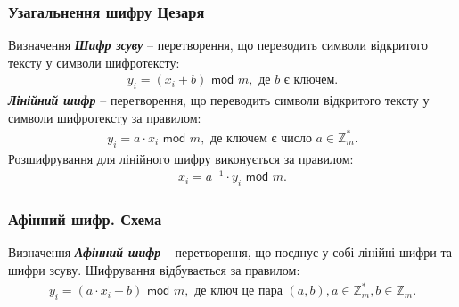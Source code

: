 \documentclass{../zkdl-presentation-template}
\begin{document}
\begin{frame}
    \frametitle{Узагальнення шифру Цезаря}
    \begin{exampleblock}{Визначення}
        \textbf{\textit{Шифр зсуву}} -- перетворення, що переводить символи відкритого тексту у символи шифротексту:
        \vspace{-5mm}
        \begin{align*}
            y_i=(x_i+b)\textsf{ mod }m, \text{ де $b$ є ключем.}
        \end{align*} 
        \textbf{\textit{Лінійний шифр}} -- перетворення, що переводить символи відкритого тексту у символи шифротексту за правилом:
        \vspace{-2mm}
        \begin{align*}
            y_i=a\cdot x_i\textsf{ mod }m, \text{ де ключем є число $a\in\mathbb{Z}_m^*$}.
        \end{align*}
        Розшифрування для лінійного шифру виконується за правилом:
        \vspace{-2mm}
        \begin{align*}
            x_i=a^{-1}\cdot y_i\textsf{ mod }m.
        \end{align*}
    \end{exampleblock}
    
    
\end{frame}


\begin{frame}
    \frametitle{Афінний шифр. Схема}
    
    \begin{exampleblock}{Визначення}
        \textbf{\textit{Афінний шифр}} -- перетворення, що поєднує у собі лінійні шифри та шифри зсуву. Шифрування відбувається за правилом:
        \begin{align*}
            y_i=(a\cdot x_i+b) \textsf{ mod }m, \text{ де ключ це пара $(a,b), a\in\mathbb{Z}_{m}^*, b\in\mathbb{Z}_m$}.
        \end{align*}
        
    \end{exampleblock}
\end{frame}
\end{document}
